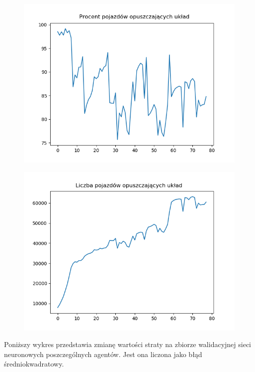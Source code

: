 \documentclass[12pt]{book}
\theoremstyle{plain}
\begin{document}
\begin{figure}[H]
	\centering
	\includegraphics[width=14cm]{images/poli_wyniki/plot_cars_out_percentage}
	\label{fig:env_poli_out_percentage}
	\centering
\end{figure}
\begin{figure}[H]
	\centering
	\includegraphics[width=14cm]{images/poli_wyniki/plot_cars_out}
	\label{fig:env_poli_out}
	\centering
\end{figure} \noindent
Poniższy wykres przedstawia zmianę wartości straty na zbiorze walidacyjnej sieci neuronowych poszczególnych agentów. Jest ona liczona jako błąd średniokwadratowy.
\end{document}
